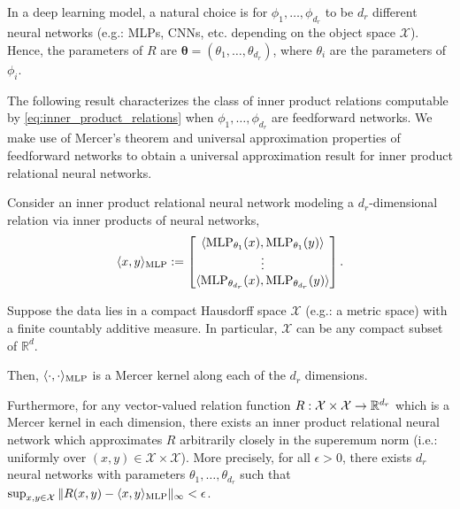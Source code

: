 In a deep learning model, a natural choice is for \(\phi_{1}, \ldots, \phi_{d_r}\) to be \(d_r\) different neural networks (e.g.: MLPs, CNNs, etc. depending on the object space \(\mathcal{X}\)). Hence, the parameters of \(R\) are \(\boldsymbol{\theta} = (\theta_{1}, \ldots, \theta_{d_r})\), where \(\theta_{i}\) are the parameters of \(\phi_{i}\).

The following result characterizes the class of inner product relations computable by \eqref{eq:inner_product_relations} when \(\phi_{1}, \ldots, \phi_{d_r}\) are feedforward networks. We make use of Mercer's theorem and universal approximation properties of feedforward networks to obtain a universal approximation result for inner product relational neural networks.


\begin{thm}
	\label{thm:function_class_inner_product_relnn}
	\hphantom{~}

	Consider an inner product relational neural network modeling a \(d_r\)-dimensional relation via inner products of neural networks,
	\begin{equation*}
		\langle x, y \rangle_{\MLP} := \begin{bmatrix}\langle \MLP_{\theta_1}(x), \MLP_{\theta_1}(y) \rangle \\ \vdots \\ \langle \MLP_{\theta_{d_r}}(x), \MLP_{\theta_{d_r}}(y) \rangle\end{bmatrix}.
	\end{equation*}

	Suppose the data lies in a compact Hausdorff space \(\mathcal{X}\) (e.g.: a metric space) with a finite countably additive measure. In particular, \(\mathcal{X}\) can be any compact subset of \(\mathbb{R}^d\).

	Then, \(\langle \cdot, \cdot \rangle_{\text{MLP}}\) is a Mercer kernel along each of the \(d_r\) dimensions.

	Furthermore, for any vector-valued relation function \(R: \mathcal{X} \times \mathcal{X} \to \mathbb{R}^{d_r}\) which is a Mercer kernel in each dimension, there exists an inner product relational neural network which approximates $R$ arbitrarily closely in the superemum norm (i.e.: uniformly over \((x,y) \in \mathcal{X}\times\mathcal{X}\)). More precisely, for all \(\epsilon > 0\), there exists \(d_r\) neural networks with parameters \(\theta_1, \ldots, \theta_{d_r}\) such that \(\sup_{x,y \in \mathcal{X}}{\lVert R(x,y) - \langle x, y \rangle_{\text{MLP}} \rVert_\infty} < \epsilon\).
\end{thm}

